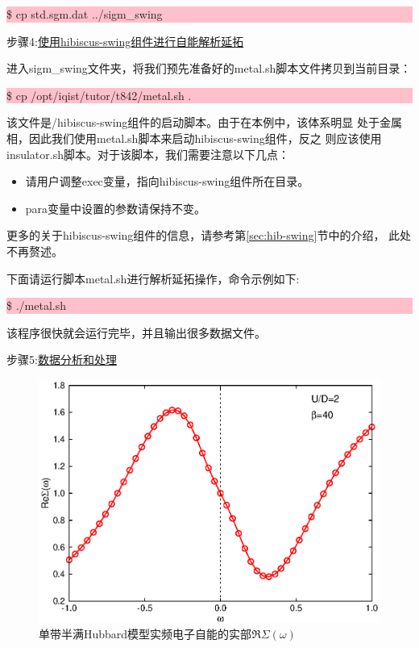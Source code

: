 \noindent\colorbox{pink}{\parbox[r]{\linewidth}{\quad \$ cp std.sgm.dat  ../sigm\_swing }}

步骤4:\underline{使用hibiscus-swing组件进行自能解析延拓}

进入sigm\_swing文件夹，将我们预先准备好的metal.sh脚本文件拷贝到当前目录：

\noindent\colorbox{pink}{\parbox[r]{\linewidth}{\quad \$ cp /opt/iqist/tutor/t842/metal.sh  . }}

该文件是{\hibiscus}/hibiscus-swing组件的启动脚本。由于在本例中，该体系明显
处于金属相，因此我们使用metal.sh脚本来启动hibiscus-swing组件，反之
则应该使用insulator.sh脚本。对于该脚本，我们需要注意以下几点：
\begin{itemize}
  \item 请用户调整exec变量，指向hibiscus-swing组件所在目录。
  \item para变量中设置的参数请保持不变。
\end{itemize}
更多的关于hibiscus-swing组件的信息，请参考第\ref{sec:hib-swing}节中的介绍，
此处不再赘述。

下面请运行脚本metal.sh进行解析延拓操作，命令示例如下:

\noindent\colorbox{pink}{\parbox[r]{\linewidth}{\quad \$ ./metal.sh }}
该程序很快就会运行完毕，并且输出很多数据文件。

步骤5:\underline{数据分析和处理}

\begin{figure}
\centering
\includegraphics{figure/sigr-real.eps}
\caption{单带半满Hubbard模型实频电子自能的实部$\Re \Sigma (\omega)$} 
\label{fig:sigr-real}
\end{figure}


